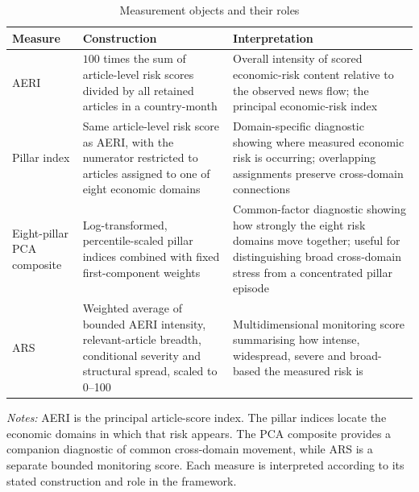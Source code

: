 \begin{table}[htbp]\centering\small\singlespacing
\caption{Measurement objects and their roles}\label{tab:measure_map}
\setlength{\tabcolsep}{4pt}
\begin{tabular}{p{2.5cm}p{4.7cm}p{6.1cm}}\toprule
Measure & Construction & Interpretation\\\midrule
AERI & $100$ times the sum of article-level risk scores divided by all retained articles in a country-month & Overall intensity of scored economic-risk content relative to the observed news flow; the principal economic-risk index\\
Pillar index & Same article-level risk score as AERI, with the numerator restricted to articles assigned to one of eight economic domains & Domain-specific diagnostic showing where measured economic risk is occurring; overlapping assignments preserve cross-domain connections\\
Eight-pillar PCA composite & Log-transformed, percentile-scaled pillar indices combined with fixed first-component weights & Common-factor diagnostic showing how strongly the eight risk domains move together; useful for distinguishing broad cross-domain stress from a concentrated pillar episode\\
ARS & Weighted average of bounded AERI intensity, relevant-article breadth, conditional severity and structural spread, scaled to 0--100 & Multidimensional monitoring score summarising how intense, widespread, severe and broad-based the measured risk is\\
\bottomrule\end{tabular}
\par\medskip\raggedright\footnotesize\textit{Notes:} AERI is the principal article-score index. The pillar indices locate the economic domains in which that risk appears. The PCA composite provides a companion diagnostic of common cross-domain movement, while ARS is a separate bounded monitoring score. Each measure is interpreted according to its stated construction and role in the framework.
\end{table}
